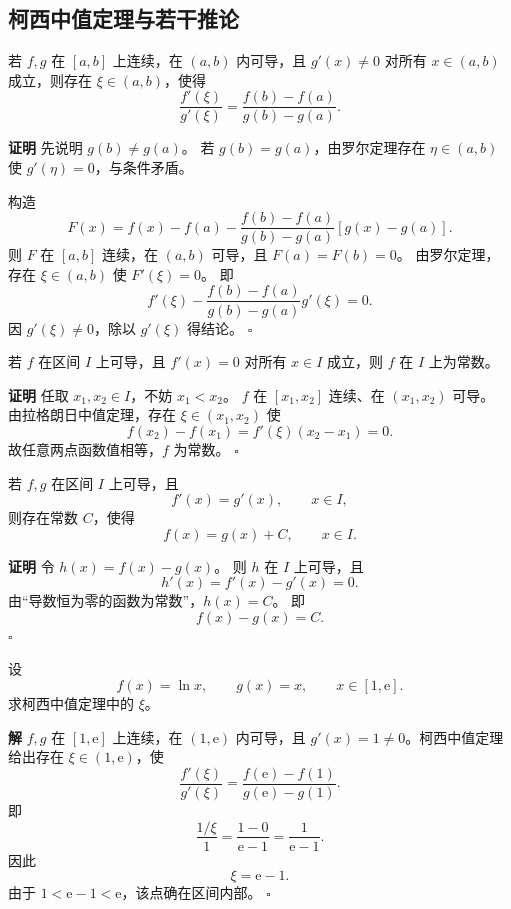 \documentclass[fontset=fandol]{ctexart}
\newenvironment{proofdetail}{\par\noindent\textbf{证明}\quad}{\hfill$\square$\par\vspace{0.8em}}
\newenvironment{solution}{\par\noindent\textbf{解}\quad}{\hfill$\square$\par\vspace{0.8em}}
\newcommand{\ee}{\mathrm{e}}
\begin{document}
\subsection{柯西中值定理与若干推论}

\begin{theorem}[柯西中值定理]
若 $f,g$ 在 $[a,b]$ 上连续，在 $(a,b)$ 内可导，且 $g'(x)\neq0$ 对所有 $x\in(a,b)$ 成立，则存在 $\xi\in(a,b)$，使得
\[
\frac{f'(\xi)}{g'(\xi)}=\frac{f(b)-f(a)}{g(b)-g(a)}.
\]
\end{theorem}
\begin{proofdetail}
先说明 $g(b)\neq g(a)$。 若 $g(b)=g(a)$，由罗尔定理存在 $\eta\in(a,b)$ 使 $g'(\eta)=0$，与条件矛盾。

构造
\[
F(x)=f(x)-f(a)-\frac{f(b)-f(a)}{g(b)-g(a)}[g(x)-g(a)].
\]
则 $F$ 在 $[a,b]$ 连续，在 $(a,b)$ 可导，且 $F(a)=F(b)=0$。 由罗尔定理，存在 $\xi\in(a,b)$ 使 $F'(\xi)=0$。 即
\[
f'(\xi)-\frac{f(b)-f(a)}{g(b)-g(a)}g'(\xi)=0.
\]
因 $g'(\xi)\neq0$，除以 $g'(\xi)$ 得结论。
\end{proofdetail}

\begin{proposition}[导数恒为零的函数为常数]
若 $f$ 在区间 $I$ 上可导，且 $f'(x)=0$ 对所有 $x\in I$ 成立，则 $f$ 在 $I$ 上为常数。
\end{proposition}
\begin{proofdetail}
任取 $x_1,x_2\in I$，不妨 $x_1<x_2$。 $f$ 在 $[x_1,x_2]$ 连续、在 $(x_1,x_2)$ 可导。 由拉格朗日中值定理，存在 $\xi\in(x_1,x_2)$ 使
\[
f(x_2)-f(x_1)=f'(\xi)(x_2-x_1)=0.
\]
故任意两点函数值相等，$f$ 为常数。
\end{proofdetail}

\begin{proposition}[导数相等的函数相差常数]
若 $f,g$ 在区间 $I$ 上可导，且
\[
f'(x)=g'(x),\qquad x\in I,
\]
则存在常数 $C$，使得
\[
f(x)=g(x)+C,\qquad x\in I.
\]
\end{proposition}
\begin{proofdetail}
令 $h(x)=f(x)-g(x)$。 则 $h$ 在 $I$ 上可导，且
\[
h'(x)=f'(x)-g'(x)=0.
\]
由“导数恒为零的函数为常数”，$h(x)=C$。 即
\[
f(x)-g(x)=C.
\]
\end{proofdetail}

\begin{example}[柯西中值定理验证]
设
\[
f(x)=\ln x,\qquad g(x)=x,\qquad x\in[1,\ee].
\]
求柯西中值定理中的 $\xi$。
\end{example}
\begin{solution}
$f,g$ 在 $[1,\ee]$ 上连续，在 $(1,\ee)$ 内可导，且 $g'(x)=1\neq0$。柯西中值定理给出存在 $\xi\in(1,\ee)$，使
\[
\frac{f'(\xi)}{g'(\xi)}
=\frac{f(\ee)-f(1)}{g(\ee)-g(1)}.
\]
即
\[
\frac{1/\xi}{1}=\frac{1-0}{\ee-1}=\frac1{\ee-1}.
\]
因此
\[
\xi=\ee-1.
\]
由于 $1<\ee-1<\ee$，该点确在区间内部。
\end{solution}
\end{document}
